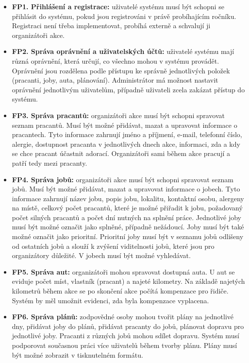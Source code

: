 \begin{itemize}
    \item \textbf{FP1. Přihlášení a registrace:} uživatelé systému musí být schopni se přihlásit do systému, pokud jsou registrováni v právě probíhajícím ročníku. Registraci není třeba implementovat, probíhá externě a schvalují ji organizátoři akce.
    \item \textbf{FP2. Správa oprávnění a uživatelských účtů:} uživatelé systému mají různá oprávnění, která určují, co všechno mohou v systému provádět. Oprávnění jsou rozdělena podle přístupu ke správně jednotlivých položek (pracanti, joby, auta, plánování). Administrátor má možnost nastavit oprávnění jednotlivým uživatelům, případně uživateli zcela zakázat přístup do systému.
    \item \textbf{FP3. Správa pracantů:} organizátoři akce musí být schopni spravovat seznam pracantů. Musí být možné přidávat, mazat a upravovat informace o pracantech. Tyto informace zahrnují jméno a příjmení, e-mail, telefonní číslo, alergie, dostupnost pracanta v jednotlivých dnech akce, informaci, zda a kdy se chce pracant účastnit adorací. Organizátoři sami během akce pracují a patří tedy mezi pracanty.
    \item \textbf{FP4. Správa jobů:} organizátoři akce musí být schopni spravovat seznam jobů. Musí být možné přidávat, mazat a upravovat informace o jobech. Tyto informace zahrnují název jobu, popis jobu, lokalitu, kontaktní osobu, alergeny na místě, celkový počet pracantů, které je možné přiřadit k jobu, požadovaný počet silných pracantů a počet dní nutných na splnění práce. Jednotlivé joby musí být možné označit jako splněné, případně nežádoucí. Joby musí být také možné označit jako prioritní. Prioritní joby musí být v seznamu jobů odlišeny od ostatních jobů a slouží k zvýšení viditelnosti jobů, které jsou pro organizátory důležité. V jobech musí být možné vyhledávat.
    \item \textbf{FP5. Správa aut:} organizátoři mohou spravovat dostupná auta. U aut se eviduje počet míst, vlastník (pracant) a najeté kilometry. Na základě najetých kilometrů během akce se po skončení akce počítá kompenzace pro řidiče. Systém by měl umožnit evidenci, zda byla kompenzace vyplacena.
    \item \textbf{FP6. Správa plánů:} zodpovědné osoby mohou tvořit plány na jednotlivé dny, přidávat joby do plánů, přidávat pracanty do jobů, plánovat dopravu pro jednotlivé joby. Pracanti z různých jobů mohou sdílet dopravu. Systém musí podporovat současnou práci více uživatelů během tvorby plánu. Plány musí být možné zobrazit v tisknutelném formátu.

\end{itemize}
